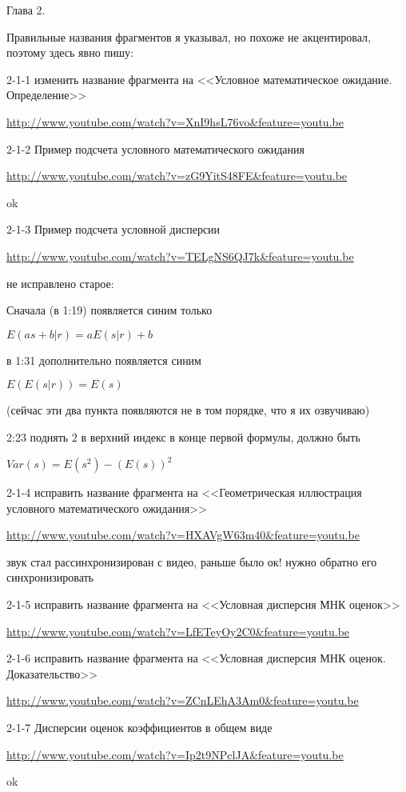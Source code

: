 \documentclass[12pt,a4paper]{article}
\begin{document}
Глава 2.

Правильные названия фрагментов я указывал, но похоже не акцентировал, поэтому здесь явно пишу:

2-1-1 изменить название фрагмента на <<Условное математическое ожидание. Определение>>

\url{http://www.youtube.com/watch?v=XnI9hsL76vo&feature=youtu.be}

2-1-2 Пример подсчета условного математического ожидания

\url{http://www.youtube.com/watch?v=zG9YitS48FE&feature=youtu.be}

ok

2-1-3 Пример подсчета условной дисперсии

\url{http://www.youtube.com/watch?v=TELgNS6QJ7k&feature=youtu.be}

не исправлено старое:

Сначала (в 1:19) появляется синим только 

$E(as + b|r) = aE(s|r) + b$

в 1:31 дополнительно появляется синим 

$E(E(s|r)) = E(s)$

(сейчас эти два пункта появляются не в том порядке, что я их озвучиваю)



2:23 поднять 2 в верхний индекс в конце первой формулы, должно быть

$Var(s)=E(s^2)-(E(s))^2$


2-1-4 исправить название фрагмента на <<Геометрическая иллюстрация условного математического ожидания>>

\url{http://www.youtube.com/watch?v=HXAVgW63m40&feature=youtu.be}

звук стал рассинхронизирован с видео, раньше было ок! нужно обратно его синхронизировать

2-1-5 исправить название фрагмента на <<Условная дисперсия МНК оценок>>

\url{http://www.youtube.com/watch?v=LfETeyOy2C0&feature=youtu.be}


2-1-6  исправить название фрагмента на <<Условная дисперсия МНК оценок. Доказательство>>

\url{http://www.youtube.com/watch?v=ZCnLEhA3Am0&feature=youtu.be}

2-1-7 Дисперсии оценок коэффициентов в общем виде

\url{http://www.youtube.com/watch?v=Ip2t9NPclJA&feature=youtu.be}

ok
\end{document}
